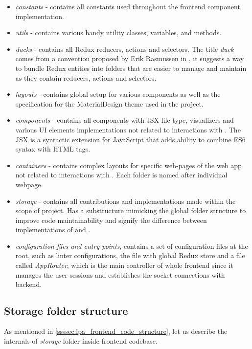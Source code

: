 \begin{itemize}
    \item \textit{constants} - contains all constants used throughout the frontend component implementation.
    \item \textit{utils} - contains various handy utility classes, variables, and methods.
    \item \textit{ducks} - contains all Redux reducers, actions and selectors. The title \textit{duck} comes from a convention proposed by Erik Rasmussen in \cite{redux_ducks}, it suggests a way to bundle Redux entities into folders that are easier to manage and maintain as they contain reducers, actions and selectors.
    \item \textit{layouts} - contains global setup for various components as well as the specification for the MaterialDesign theme used in the project.
    \item \textit{components} - contains all components with JSX file type, visualizers and various UI elements implementations not related to interactions with \solid{}. The JSX is a syntactic extension for JavaScript that adds ability to combine ES6 syntax with HTML tags.
    \item \textit{containers} - contains complex layouts for specific web-pages of the web app not related to interactions with \solid{}. Each folder is named after individual webpage. 
    \item \textit{storage} - contains all contributions and implementations made within the scope of \lpas{} project. Has a substructure mimicking the global folder structure to improve code maintainability and signify the difference between implementations of \lpa{} and \lpas{}.
    \item \textit{configuration files and entry points}, contains a set of configuration files at the root, such as linter configurations, the file with global Redux store and a file called \textit{AppRouter}, which is the main controller of whole frontend since it manages the user sessions and establishes the socket connections with \lpa{} backend.
\end{itemize}

\subsection{Storage folder structure}
\label{sssec:storage_folder_structure}

As mentioned in \autoref{ssssec:lpa_frontend_code_structure}, let us describe the internals of \textit{storage} folder inside \lpa{} frontend codebase. 


